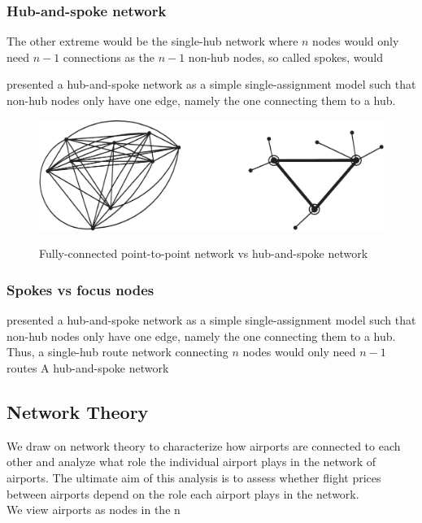 \subsubsection{Hub-and-spoke network}
The other extreme would be the single-hub network where $n$ nodes would only need $n-1$ connections as the $n-1$ non-hub nodes, so called spokes, would
 \par
\citet{o1987quadratic} presented a hub-and-spoke network as a simple single-assignment model such that non-hub nodes only have one edge, namely the one connecting them to a hub.


\begin{figure}[H]
  \centering
  \caption{Fully-connected point-to-point network vs hub-and-spoke network}
    \includegraphics[width=1. \textwidth]{03_figures/Bryan_1999_networks}
  \label{fig:different_networks}
\end{figure}

\subsubsection{Spokes vs focus nodes}
\citet{o1987quadratic} presented a hub-and-spoke network as a simple single-assignment model such that non-hub nodes only have one edge, namely the one connecting them to a hub. Thus, a single-hub route network connecting $n$ nodes would only need $n-1$ routes
A hub-and-spoke network








\subsection{Network Theory}
\label{subsec:Network Theory}
We draw on network theory to characterize how airports are connected to each other and analyze what role the individual airport plays in the network of airports. The ultimate aim of this analysis is to assess whether flight prices between airports depend on the role each airport plays in the network. \\
We view airports as nodes in the n

